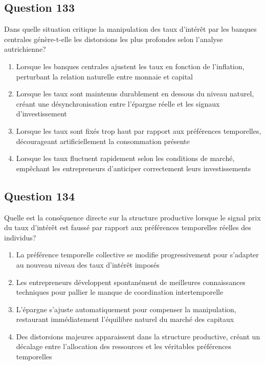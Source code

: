 \documentclass[12pt,a4paper]{article}
\begin{document}
\bigskip


\subsection*{Question 133}
Dans quelle situation critique la manipulation des taux d'intérêt par les banques centrales génère-t-elle les distorsions les plus profondes selon l'analyse autrichienne?

\begin{enumerate}[label=\Alph*., leftmargin=*]
\item Lorsque les banques centrales ajustent les taux en fonction de l'inflation, perturbant la relation naturelle entre monnaie et capital
\item Lorsque les taux sont maintenus durablement en dessous du niveau naturel, créant une désynchronisation entre l'épargne réelle et les signaux d'investissement
\item Lorsque les taux sont fixés trop haut par rapport aux préférences temporelles, décourageant artificiellement la consommation présente
\item Lorsque les taux fluctuent rapidement selon les conditions de marché, empêchant les entrepreneurs d'anticiper correctement leurs investissements
\end{enumerate}

\bigskip


\subsection*{Question 134}
Quelle est la conséquence directe sur la structure productive lorsque le signal prix du taux d'intérêt est faussé par rapport aux préférences temporelles réelles des individus?

\begin{enumerate}[label=\Alph*., leftmargin=*]
\item La préférence temporelle collective se modifie progressivement pour s'adapter au nouveau niveau des taux d'intérêt imposés
\item Les entrepreneurs développent spontanément de meilleures connaissances techniques pour pallier le manque de coordination intertemporelle
\item L'épargne s'ajuste automatiquement pour compenser la manipulation, restaurant immédiatement l'équilibre naturel du marché des capitaux
\item Des distorsions majeures apparaissent dans la structure productive, créant un décalage entre l'allocation des ressources et les véritables préférences temporelles
\end{enumerate}
\end{document}
